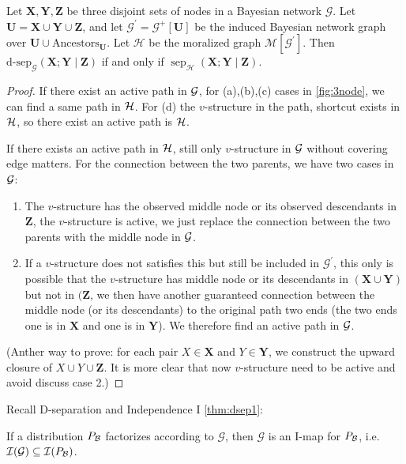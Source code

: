 \documentclass{article}
\begin{document}
\begin{lema}\label{lem:kdkjf}
 Let $\boldsymbol{X}, \boldsymbol{Y}, \boldsymbol{Z}$ be three disjoint sets of nodes in a Bayesian network $\mathcal{G}$. Let $\boldsymbol{U}=\boldsymbol{X} \cup \boldsymbol{Y} \cup \boldsymbol{Z}$, and let $\mathcal{G}^{\prime}=\mathcal{G}^{+}[\boldsymbol{U}]$ be the induced Bayesian network graph over $\boldsymbol{U} \cup\mathrm{Ancestors}_{\boldsymbol{U}}$. Let $\mathcal{H}$ be the moralized graph $\mathcal{M}\left[\mathcal{G}^{\prime}\right] .$ Then $\text{$\mathrm{d}$-$\mathrm{sep}$}_{\mathcal{G}}(\boldsymbol{X} ; \boldsymbol{Y} \mid \boldsymbol{Z})$ if and only if $\operatorname{sep}_{\mathcal{H}}(\boldsymbol{X} ; \boldsymbol{Y} \mid \boldsymbol{Z}) .$ 
\end{lema}
\begin{proof}
If there exist an active path in $\mathcal{G}$, for (a),(b),(c) cases in \cref{fig:3node}, we can find a same path in $\mathcal{H}$. For (d) the $v$-structure in the path, shortcut exists in $\mathcal{H}$, so there exist an active path is $\mathcal{H}$.

If there exists an active path in $\mathcal{H}$, still only $v$-structure in $\mathcal{G}$ without covering edge matters. For the connection between the two parents, we have two cases in $\mathcal{G}$:
\begin{enumerate}
    \item The $v$-structure has the observed middle node or its observed descendants in $\boldsymbol{Z}$, the $v$-structure is active, we just replace the connection between the two parents with the middle node in $\mathcal{G}$.
    \item If a $v$-structure does not satisfies this but still be included in $\mathcal{G}^{\prime}$, this only is possible that the $v$-structure has middle node or its descendants  in $(\boldsymbol{X}\cup\boldsymbol{Y})$ but not in $(\boldsymbol{Z}$, we then have another guaranteed connection between the middle node (or its descendants) to the original path two ends (the two ends one is in $\boldsymbol{X}$ and one is in $\boldsymbol{Y}$). We therefore find an active path in $\mathcal{G}$.
\end{enumerate}
(Anther way to prove: for each pair $X\in\boldsymbol{X}$ and $Y\in\boldsymbol{Y}$, we construct the upward closure of $X\cup Y\cup\boldsymbol{Z}$. It is more clear that now $v$-structure need to be active and avoid discuss case 2.)
\end{proof}
Recall {D-separation and Independence I}  \cref{thm:dsep1}:
\begin{thma}
If a distribution $P_{\mathcal{B}}$ factorizes according to $\mathcal{G}$, then $\mathcal{G}$ is an I-map for $P_{\mathcal{B}}$, i.e. $\mathcal{I}(\mathcal{G}) \subseteq \mathcal{I}(P_{\mathcal{B}})$.
\end{thma}
\end{document}
